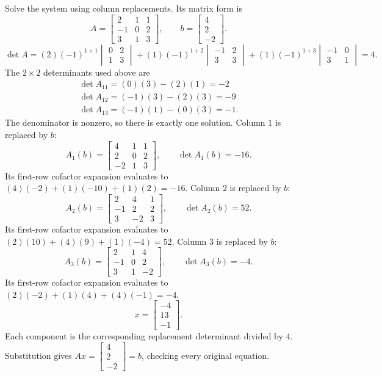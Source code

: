 \goal Solve the system using column replacements. Its matrix form is
\[A=\begin{bmatrix}2&1&1\\-1&0&2\\3&1&3\end{bmatrix},\qquad b=\begin{bmatrix}4\\2\\-2\end{bmatrix}.\]
\[
\det A=(2)(-1)^{1+1}\begin{vmatrix}0&2\\1&3\end{vmatrix} + (1)(-1)^{1+2}\begin{vmatrix}-1&2\\3&3\end{vmatrix} + (1)(-1)^{1+3}\begin{vmatrix}-1&0\\3&1\end{vmatrix}=4.
\]
The $2\times2$ determinants used above are
\[
\begin{gathered}\det A_{11}=(0)(3)-(2)(1)=-2\\\det A_{12}=(-1)(3)-(2)(3)=-9\\\det A_{13}=(-1)(1)-(0)(3)=-1.\end{gathered}
\]
The denominator is nonzero, so there is exactly one solution.
Column $1$ is replaced by $b$:
\[A_1(b)=\begin{bmatrix}4&1&1\\2&0&2\\-2&1&3\end{bmatrix},\qquad\det A_1(b)=-16.\]
Its first-row cofactor expansion evaluates to $(4)(-2) + (1)(-10) + (1)(2)=-16$.
Column $2$ is replaced by $b$:
\[A_2(b)=\begin{bmatrix}2&4&1\\-1&2&2\\3&-2&3\end{bmatrix},\qquad\det A_2(b)=52.\]
Its first-row cofactor expansion evaluates to $(2)(10) + (4)(9) + (1)(-4)=52$.
Column $3$ is replaced by $b$:
\[A_3(b)=\begin{bmatrix}2&1&4\\-1&0&2\\3&1&-2\end{bmatrix},\qquad\det A_3(b)=-4.\]
Its first-row cofactor expansion evaluates to $(2)(-2) + (1)(4) + (4)(-1)=-4$.
\[x=\begin{bmatrix}-4\\13\\-1\end{bmatrix}.\]
Each component is the corresponding replacement determinant divided by $4$. Substitution gives $Ax=\begin{bmatrix}4\\2\\-2\end{bmatrix}=b$, checking every original equation.


